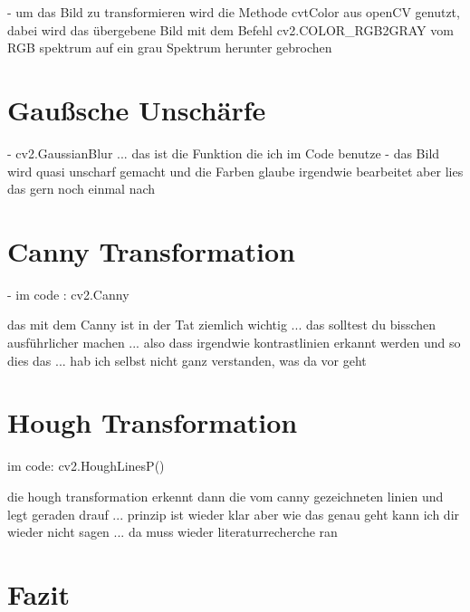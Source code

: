 - um das Bild zu transformieren wird die Methode cvtColor aus openCV genutzt, dabei wird das übergebene Bild mit dem Befehl cv2.COLOR\_RGB2GRAY vom RGB spektrum auf ein grau Spektrum herunter gebrochen


\section{Gaußsche Unschärfe} %

- cv2.GaussianBlur ... das ist die Funktion die ich im Code benutze
- das Bild wird quasi unscharf gemacht und die Farben glaube irgendwie bearbeitet aber lies das gern noch einmal nach


\section{Canny Transformation} %
 
- im code : cv2.Canny

das mit dem Canny ist in der Tat ziemlich wichtig ... das solltest du bisschen ausführlicher machen ... also dass irgendwie kontrastlinien erkannt werden und so dies das ... hab ich selbst nicht ganz verstanden, was da vor geht

\section{Hough Transformation} %


im code: cv2.HoughLinesP()

die hough transformation erkennt dann die vom canny gezeichneten linien und legt geraden drauf ... prinzip ist wieder klar aber wie das genau geht kann ich dir wieder nicht sagen ... da muss wieder literaturrecherche ran

\section{Fazit}
